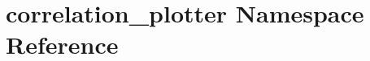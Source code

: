 \hypertarget{namespacecorrelation__plotter}{
\section{correlation\_\-plotter Namespace Reference}
\label{namespacecorrelation__plotter}
}
